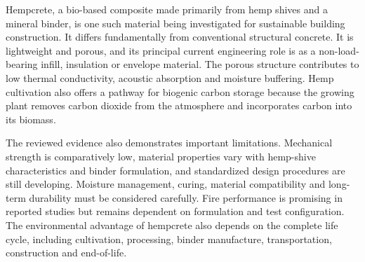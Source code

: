 \documentclass[12pt,a4paper,final]{report}
\begin{document}
Hempcrete, a bio-based composite made primarily from hemp shives and a mineral binder,
is one such material being investigated for sustainable building construction. It differs
fundamentally from conventional structural concrete. It is lightweight and porous, and its
principal current engineering role is as a non-load-bearing infill, insulation or envelope
material. The porous structure contributes to low thermal conductivity, acoustic absorption
and moisture buffering. Hemp cultivation also offers a pathway for biogenic carbon storage
because the growing plant removes carbon dioxide from the atmosphere and incorporates
carbon into its biomass.

The reviewed evidence also demonstrates important limitations. Mechanical strength is
comparatively low, material properties vary with hemp-shive characteristics and binder
formulation, and standardized design procedures are still developing. Moisture management,
curing, material compatibility and long-term durability must be considered carefully. Fire
performance is promising in reported studies but remains dependent on formulation and test
configuration. The environmental advantage of hempcrete also depends on the complete life
cycle, including cultivation, processing, binder manufacture, transportation, construction and
end-of-life.

\endgroup
\newpage
\begingroup
\setlength{\parskip}{0pt}
\tableofcontents
\endgroup

\newpage
\begingroup
\setlength{\parskip}{0pt}
\listoffigures
\endgroup

\newpage
{}
\setcounter{page}{1}

\end{document}
